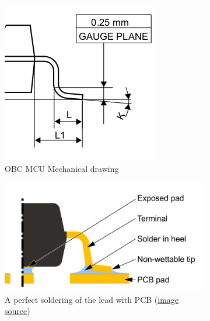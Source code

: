 \documentclass[final]{cubedoc}
\begin{document}
	
	\begin{figure}[h!]
		\centering
		\begin{subfigure}{.5\textwidth}
			\centering
			\includegraphics[width=0.7\linewidth]{docs/gullwing_leads.png}
			\caption{OBC MCU Mechanical drawing}
			\label{fig:sub1}
		\end{subfigure}%
		\begin{subfigure}{.5\textwidth}
			\centering
			\includegraphics[keepaspectratio, width=1.3\linewidth, height=.4\textheight]{docs/gullwing_solder.png}
			\caption{A perfect soldering of the lead with PCB \small{(\href{https://web.archive.org/web/20200818154144/https://www.infineon.com/dgdl/Infineon-Board+Assembly+Recommendations-Gullwing-Package-v04_00-EN.pdf?fileId=5546d4626d82c047016d8c0320de42d0}{image source}})}
			\label{fig:sub2}
		\end{subfigure}
		\caption{}
		\label{fig:test}
	\end{figure}
	
\end{document}
